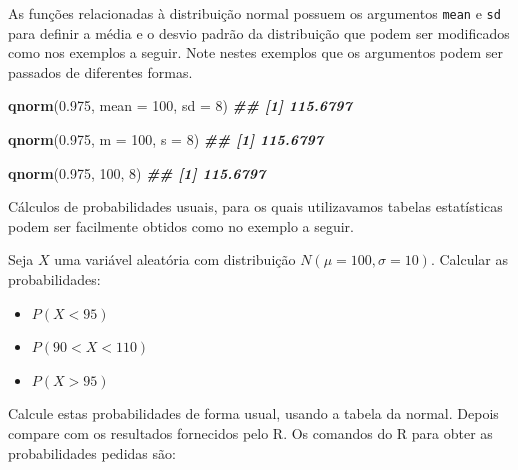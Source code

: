 \documentclass[
]{book}
\newenvironment{Shaded}{\begin{snugshade}}{\end{snugshade}}
\newcommand{\AttributeTok}[1]{\textcolor[rgb]{0.13,0.29,0.53}{#1}}
\newcommand{\DecValTok}[1]{\textcolor[rgb]{0.00,0.00,0.81}{#1}}
\newcommand{\DocumentationTok}[1]{\textcolor[rgb]{0.56,0.35,0.01}{\textbf{\textit{#1}}}}
\newcommand{\FloatTok}[1]{\textcolor[rgb]{0.00,0.00,0.81}{#1}}
\newcommand{\FunctionTok}[1]{\textcolor[rgb]{0.13,0.29,0.53}{\textbf{#1}}}
\newcommand{\NormalTok}[1]{#1}
\begin{document}
As funções relacionadas à distribuição normal possuem os argumentos \texttt{mean} e \texttt{sd} para definir a média e o desvio padrão da distribuição que podem ser modificados como nos exemplos a seguir. Note nestes exemplos que os argumentos podem ser passados de diferentes formas.

\begin{Shaded}
\begin{Highlighting}[]
\FunctionTok{qnorm}\NormalTok{(}\FloatTok{0.975}\NormalTok{, }\AttributeTok{mean =} \DecValTok{100}\NormalTok{, }\AttributeTok{sd =} \DecValTok{8}\NormalTok{)}
\DocumentationTok{\#\# [1] 115.6797}

\FunctionTok{qnorm}\NormalTok{(}\FloatTok{0.975}\NormalTok{, }\AttributeTok{m =} \DecValTok{100}\NormalTok{, }\AttributeTok{s =} \DecValTok{8}\NormalTok{)}
\DocumentationTok{\#\# [1] 115.6797}

\FunctionTok{qnorm}\NormalTok{(}\FloatTok{0.975}\NormalTok{, }\DecValTok{100}\NormalTok{, }\DecValTok{8}\NormalTok{)}
\DocumentationTok{\#\# [1] 115.6797}
\end{Highlighting}
\end{Shaded}

Cálculos de probabilidades usuais, para os quais utilizavamos tabelas estatísticas podem ser facilmente obtidos como no exemplo a seguir.

Seja \(X\) uma variável aleatória com distribuição \(N(\mu=100, \sigma=10)\). Calcular as probabilidades:

\begin{itemize}
\item
  \(P(X < 95)\)
\item
  \(P(90 < X < 110)\)
\item
  \(P(X > 95)\)
\end{itemize}

Calcule estas probabilidades de forma usual, usando a tabela da normal. Depois compare com os resultados fornecidos pelo R. Os comandos do R para obter as probabilidades pedidas são:
\end{document}
